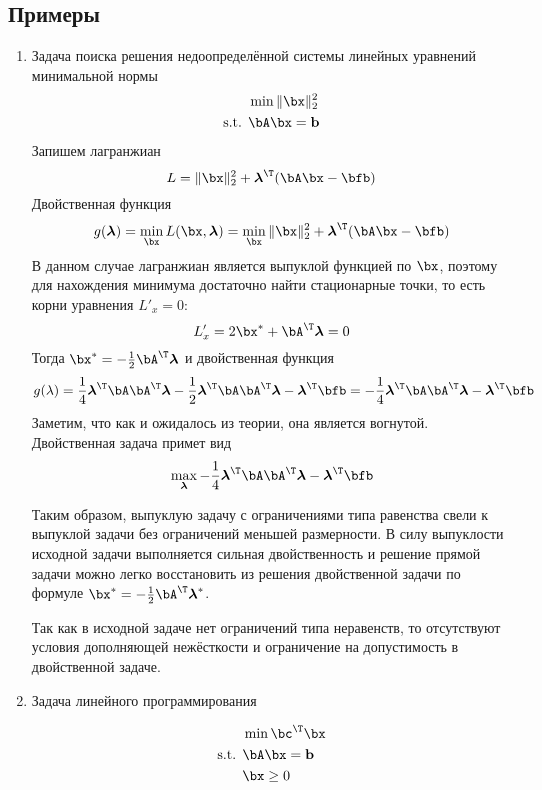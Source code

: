 \documentclass[12pt]{article}
\newcommand{\blambda}{\boldsymbol{\lambda}}
\begin{document}
\subsection{Примеры}

\begin{enumerate}

\item Задача поиска решения недоопределённой системы линейных уравнений минимальной нормы
\begin{equation*}
\begin{split}
& \min \| \bx\|^2_2\\
\text{s.t. } & \bA\bx = \mathbf{b}
\end{split}
\end{equation*}
Запишем лагранжиан
\[
L = \|\bx\|_2^2 + \blambda^{\T} (\bA\bx - \bfb)
\]
Двойственная функция
\[
g(\blambda) = \min_{\bx} L(\bx, \blambda) = \min_{\bx} \|\bx\|_2^2 + \blambda^{\T} (\bA\bx - \bfb)
\]
В данном случае лагранжиан является выпуклой функцией по $\bx$, поэтому для нахождения минимума достаточно найти стационарные точки, то есть корни уравнения $L'_x = 0$:
\[
L'_x = 2\bx^* + \bA^{\T}\blambda = 0
\]
Тогда $\bx^* = -\frac{1}{2} \bA^{\T}\blambda$ и двойственная функция
\[
g(\lambda) = \frac{1}{4}\blambda^{\T}\bA\bA^{\T}\blambda - \frac{1}{2}\blambda^{\T} \bA\bA^{\T}\blambda - \blambda^{\T}\bfb = - \frac{1}{4}\blambda^{\T} \bA\bA^{\T}\blambda - \blambda^{\T}\bfb
\]
Заметим, что как и ожидалось из теории, она является вогнутой.
Двойственная задача примет вид 
\[
\max_{\blambda} - \frac{1}{4}\blambda^{\T} \bA\bA^{\T}\blambda - \blambda^{\T}\bfb
\]

Таким образом, выпуклую задачу с ограничениями типа равенства свели к выпуклой задачи без ограничений меньшей размерности.
В силу выпуклости исходной задачи выполняется сильная двойственность и решение прямой задачи можно легко восстановить из решения двойственной задачи по формуле $\bx^* = -\frac{1}{2} \bA^{\T}\blambda^*$.

Так как в исходной задаче нет ограничений типа неравенств, то отсутствуют условия дополняющей нежёсткости и ограничение на допустимость в двойственной задаче.

\item Задача линейного программирования

\begin{equation*}
\begin{split}
& \min \bc^{\T}\bx\\
\text{s.t. } & \bA\bx = \mathbf{b}\\
& \bx \geq 0
\end{split}
\end{equation*}


\end{enumerate}
\end{document}
